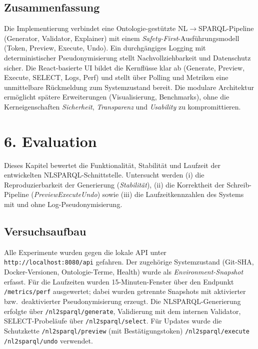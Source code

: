 \section{Zusammenfassung}
Die Implementierung verbindet eine Ontologie-gestützte NL$\rightarrow$SPARQL-Pipeline (Generator, Validator, Explainer) mit einem \emph{Safety-First}-Ausführungsmodell (Token, Preview, Execute, Undo). Ein durchgängiges Logging mit deterministischer Pseudonymisierung stellt Nachvollziehbarkeit und Datenschutz sicher. Die React-basierte UI bildet die Kernflüsse klar ab (Generate, Preview, Execute, SELECT, Logs, Perf) und stellt über Polling und Metriken eine unmittelbare Rückmeldung zum Systemzustand bereit. Die modulare Architektur ermöglicht spätere Erweiterungen (Visualisierung, Benchmarks), ohne die Kerneigenschaften \emph{Sicherheit}, \emph{Transparenz} und \emph{Usability} zu kompromittieren.





\chapter{6. Evaluation}
\label{sec:Evaluation}

Dieses Kapitel bewertet die Funktionalität, Stabilität und Laufzeit der entwickelten NL{\textrightarrow}SPARQL-Schnittstelle. Untersucht werden (i) die Reproduzierbarkeit der Generierung (\emph{Stabilität}), (ii) die Korrektheit der Schreib-Pipeline (\emph{Preview{\textrightarrow}Execute{\textrightarrow}Undo}) sowie (iii) die Laufzeitkennzahlen des Systems mit und ohne Log-Pseudonymisierung.

\section{Versuchsaufbau}
\label{subsec:evaluation-setup}
Alle Experimente wurden gegen die lokale API unter \texttt{http://localhost:8080/api} gefahren. Der zugehörige Systemzustand (Git-SHA, Docker-Versionen, Ontologie-Terme, Health) wurde als \emph{Environment-Snapshot} erfasst. Für die Laufzeiten wurden 15-Minuten-Fenster über den Endpunkt \texttt{/metrics/perf} ausgewertet; dabei wurden getrennte Snapshots mit aktivierter bzw.\ deaktivierter Pseudonymisierung erzeugt. Die NL{\textrightarrow}SPARQL-Generierung erfolgte über \texttt{/nl2sparql/generate}, Validierung mit dem internen Validator, SELECT-Probeläufe über \texttt{/nl2sparql/select}. Für Updates wurde die Schutzkette \texttt{/nl2sparql/preview} (mit Bestätigungstoken) {\textrightarrow} \texttt{/nl2sparql/execute} {\textrightarrow} \texttt{/nl2sparql/undo} verwendet.


